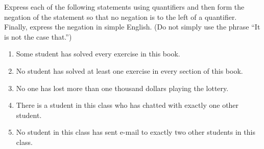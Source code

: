 \documentclass[../main.tex]{subfiles}
\begin{document}
\begin{homework}
    Express each of the following statements using quantifiers and then form the negation of the statement so that no negation is to the left of a quantifier. Finally, express the negation in simple English. (Do not simply use the phrase ``It is not the case that.'')
    \begin{enumerate}[label=(\alph*)]
        \item Some student has solved every exercise in this book.
        \item No student has solved at least one exercise in every section of this book.
        \item No one has lost more than one thousand dollars playing the lottery.
        \item There is a student in this class who has chatted with exactly one other student.
        \item No student in this class has sent e-mail to exactly two other students in this class.
    \end{enumerate}
\end{homework}
\end{document}
